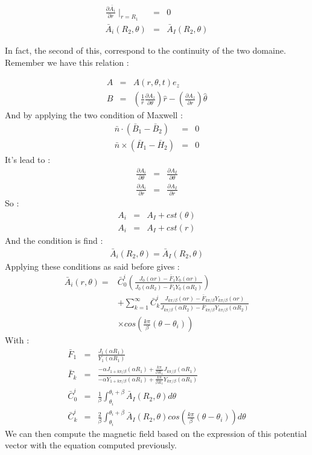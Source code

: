 \begin{eqnarray}
\frac{\partial\bar{A_i}}{\partial r}{\mid_{r = R_1}} &=& 0\\
\bar{A}_i(R_2,\theta) &=& \bar{A}_I(R_2,\theta)
\end{eqnarray}

In fact, the second of this, correspond to the continuity of the two domaine.
Remember we have this relation :

\begin{eqnarray}
A &=& A(r,\theta,t)e_z\\
B &=& \left(\frac{1}{r} \frac{\partial A_z}{\partial \theta}\right)\hat{r}-\left(\frac{\partial A_z}{\partial r}\right)\hat{\theta}
\end{eqnarray}
And by applying the two condition of Maxwell : 
\begin{eqnarray}
\bar{n} \cdot (\bar{B}_1 - \bar{B}_2) &=& 0\\
\bar{n} \times (\bar{H}_1 - \bar{H}_2) &=& 0
\end{eqnarray}
It's lead to : 
\begin{eqnarray}
\frac{\partial A_i}{\partial \theta} &=& \frac{\partial A_I}{\partial \theta}\\
\frac{\partial A_i}{\partial r} &=& \frac{\partial A_I}{\partial r}
\end{eqnarray}
So :
\begin{eqnarray}
A_i &=& A_I + cst(\theta)\\
A_i &=& A_I + cst(r)
\end{eqnarray}
And the condition is find :
\begin{eqnarray}
\bar{A}_i(R_2,\theta) = \bar{A}_I(R_2,\theta)
\end{eqnarray}
Applying these conditions as said before gives :
\begin{eqnarray}
\bar{A}_i(r,\theta) = &\bar{C}_0^i\left( \frac{J_0(\alpha r) - \bar{F}_1Y_0(\alpha r)}{J_0(\alpha R_2) - \bar{F}_1Y_0(\alpha R_2)} \right )\\
&+ \sum_{k=1}^\infty \bar{C}_k^i \frac{J_{k\pi/\beta}(\alpha r) - \bar{F}_{k\pi/\beta}Y_{k\pi/\beta}(\alpha r)}{J_{k\pi/\beta}(\alpha R_2) - \bar{F}_{k\pi/\beta}Y_{k\pi/\beta}(\alpha R_2)} \\
& \times cos\left(\frac{k\pi}{\beta}(\theta-\theta_i)\right)
\end{eqnarray}
With :
\begin{eqnarray}
\bar{F}_1 &=& \frac{J_1(\alpha R_1)}{Y_1(\alpha R_1)}\\
\bar{F}_k &=& \frac{-\alpha J_{1+k\pi/\beta}(\alpha R_1) + \frac{k\pi}{\beta R_1}J_{k\pi/\beta}(\alpha R_1)}{-\alpha Y_{1+k\pi/\beta}(\alpha R_1) + \frac{k\pi}{\beta R_1}Y_{k\pi/\beta}(\alpha R_1)}\\
\bar{C}_0^i &=& \frac{1}{\beta} \int_{\theta_i}^{\theta_i+\beta} \bar{A}_I(R_2,\theta)d\theta\\
\bar{C}_k^i &=& \frac{2}{\beta} \int_{\theta_i}^{\theta_i+\beta} \bar{A}_I(R_2,\theta)cos\left(\frac{k\pi}{\beta}(\theta-\theta_i)\right)d\theta
\end{eqnarray}
We can then compute the magnetic field based on the expression of this potential vector with the equation computed previously.

